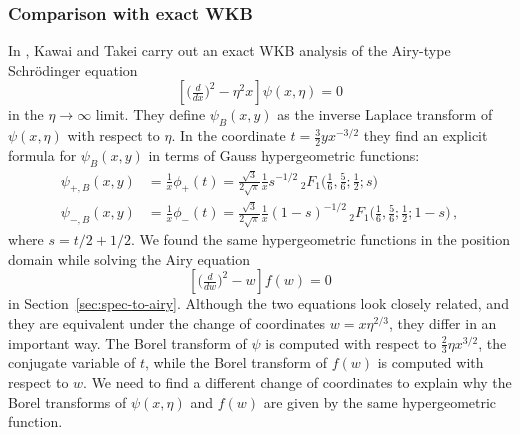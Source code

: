 \documentclass{article}
\theoremstyle{definition}
\theoremstyle{plain}
\begin{document}
\subsubsection{Comparison with exact WKB}
%
In \cite{kawai-takei}, Kawai and Takei carry out an exact WKB analysis of the Airy-type Schr\"{o}dinger equation
\begin{equation}
\label{WKB_Airy} 
\left[\big(\tfrac{d}{dx}\big)^2 - \eta^2 x \right] \psi(x, \eta) = 0 
\end{equation}
in the $\eta \to \infty$ limit. They define $\psi_B(x, y)$ as the inverse Laplace transform of $\psi(x, \eta)$ with respect to $\eta$. In the coordinate $t=\frac{3}{2}yx^{-3/2}$ they find an explicit formula for $\psi_B(x,y)$ in terms of Gauss hypergeometric functions:
\begin{align*}
\psi_{+,B}(x,y)&=\frac{1}{x}\phi_+(t)=\frac{\sqrt{3}}{2\sqrt{\pi}}\frac{1}{x}s^{-1/2}\, {}_2F_1\big(\tfrac{1}{6},\tfrac{5}{6};\tfrac{1}{2};s\big)\\
\psi_{-,B}(x,y)&=\frac{1}{x}\phi_-(t)=\frac{\sqrt{3}}{2\sqrt{\pi}}\frac{1}{x}(1-s)^{-1/2}\, {}_2F_1\big(\tfrac{1}{6},\tfrac{5}{6};\tfrac{1}{2};1-s\big)\,,
\end{align*}
where $s=t/2+1/2$. We found the same hypergeometric functions in the position domain while solving the Airy equation
\begin{equation}
\label{Airy}
\left[\big(\tfrac{d}{dw}\big)^2 -  w \right] f(w) = 0
\end{equation}
in Section~\ref{sec:spec-to-airy}. Although the two equations look closely related, and they are equivalent under the change of coordinates $w=x\eta^{2/3}$, they differ in an important way. The Borel transform of $\psi$ is computed with respect to $\frac{2}{3}\eta x^{3/2}$, the conjugate variable of $t$, while the Borel transform of $f(w)$ is computed with respect to $w$. We need to find a different change of coordinates to explain why the Borel transforms of $\psi(x,\eta)$ and $f(w)$ are given by the same hypergeometric function. 
\end{document}
